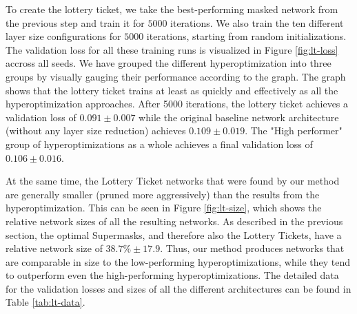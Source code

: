 \documentclass[12pt,final,twoside]{article}
\theoremstyle{plain}
\theoremstyle{definition}
\theoremstyle{remark}
\theoremstyle{named}
\begin{document}
To create the lottery ticket, we take the best-performing masked network from the previous step and train it for $5000$ iterations. We also train the ten different layer size configurations for $5000$ iterations, starting from random initializations. The validation loss for all these training runs is visualized in Figure \ref{fig:lt-loss} accross all seeds. We have grouped the different hyperoptimization into three groups by visually gauging their performance according to the graph. The graph shows that the lottery ticket trains at least as quickly and effectively as all the hyperoptimization approaches. After 5000 iterations, the lottery ticket achieves a validation loss of $0.091 \pm 0.007$ while the original baseline network architecture (without any layer size reduction) achieves $0.109 \pm 0.019$. The "High performer" group of hyperoptimizations as a whole achieves a final validation loss of $0.106 \pm 0.016$.

At the same time, the Lottery Ticket networks that were found by our method are generally smaller (pruned more aggressively) than the results from the hyperoptimization. This can be seen in Figure \ref{fig:lt-size}, which shows the relative network sizes of all the resulting networks. As described in the previous section, the optimal Supermasks, and therefore also the Lottery Tickets, have a relative network size of $38.7\% \pm 17.9$. Thus, our method produces networks that are comparable in size to the low-performing hyperoptimizations, while they tend to outperform even the high-performing hyperoptimizations. The detailed data for the validation losses and sizes of all the different architectures can be found in Table \ref{tab:lt-data}.
\end{document}
